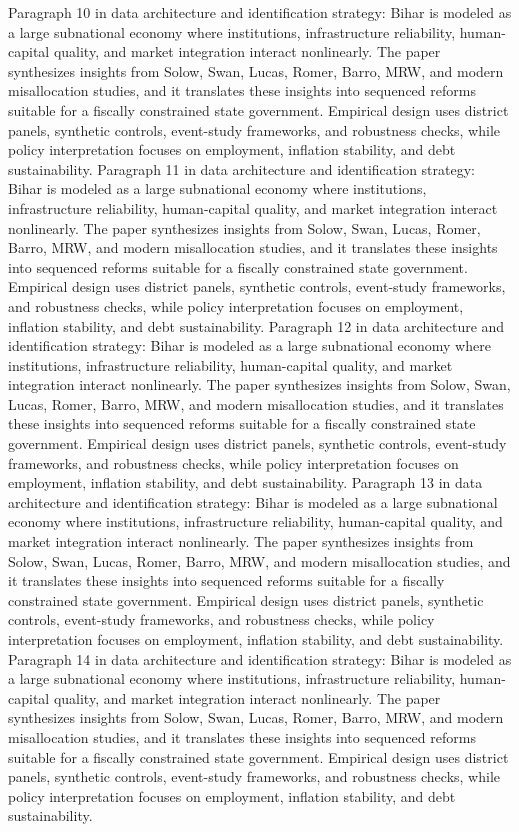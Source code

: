 \documentclass[preprint,12pt]{elsarticle}
\begin{document}
Paragraph 10 in data architecture and identification strategy: Bihar is modeled as a large subnational economy where institutions, infrastructure reliability, human-capital quality, and market integration interact nonlinearly. The paper synthesizes insights from Solow, Swan, Lucas, Romer, Barro, MRW, and modern misallocation studies, and it translates these insights into sequenced reforms suitable for a fiscally constrained state government. Empirical design uses district panels, synthetic controls, event-study frameworks, and robustness checks, while policy interpretation focuses on employment, inflation stability, and debt sustainability.
Paragraph 11 in data architecture and identification strategy: Bihar is modeled as a large subnational economy where institutions, infrastructure reliability, human-capital quality, and market integration interact nonlinearly. The paper synthesizes insights from Solow, Swan, Lucas, Romer, Barro, MRW, and modern misallocation studies, and it translates these insights into sequenced reforms suitable for a fiscally constrained state government. Empirical design uses district panels, synthetic controls, event-study frameworks, and robustness checks, while policy interpretation focuses on employment, inflation stability, and debt sustainability.
Paragraph 12 in data architecture and identification strategy: Bihar is modeled as a large subnational economy where institutions, infrastructure reliability, human-capital quality, and market integration interact nonlinearly. The paper synthesizes insights from Solow, Swan, Lucas, Romer, Barro, MRW, and modern misallocation studies, and it translates these insights into sequenced reforms suitable for a fiscally constrained state government. Empirical design uses district panels, synthetic controls, event-study frameworks, and robustness checks, while policy interpretation focuses on employment, inflation stability, and debt sustainability.
Paragraph 13 in data architecture and identification strategy: Bihar is modeled as a large subnational economy where institutions, infrastructure reliability, human-capital quality, and market integration interact nonlinearly. The paper synthesizes insights from Solow, Swan, Lucas, Romer, Barro, MRW, and modern misallocation studies, and it translates these insights into sequenced reforms suitable for a fiscally constrained state government. Empirical design uses district panels, synthetic controls, event-study frameworks, and robustness checks, while policy interpretation focuses on employment, inflation stability, and debt sustainability.
Paragraph 14 in data architecture and identification strategy: Bihar is modeled as a large subnational economy where institutions, infrastructure reliability, human-capital quality, and market integration interact nonlinearly. The paper synthesizes insights from Solow, Swan, Lucas, Romer, Barro, MRW, and modern misallocation studies, and it translates these insights into sequenced reforms suitable for a fiscally constrained state government. Empirical design uses district panels, synthetic controls, event-study frameworks, and robustness checks, while policy interpretation focuses on employment, inflation stability, and debt sustainability.
\end{document}

